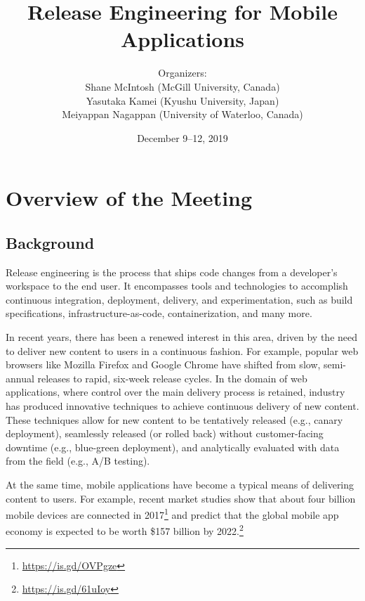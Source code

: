 \documentclass[a4paper]{article}
\begin{document}
\SHONANmakecover

\title{Release Engineering for Mobile Applications}
\author{Organizers:\\
Shane McIntosh (McGill University, Canada)\\
Yasutaka Kamei (Kyushu University, Japan)\\
Meiyappan Nagappan (University of Waterloo, Canada)}
\date{December 9--12, 2019}
\maketitle

\section{Overview of the Meeting}

\subsection{Background}

Release engineering is the process that ships code changes from a developer's workspace to the end user.
It encompasses tools and technologies to accomplish continuous integration, deployment, delivery, and experimentation, such as build specifications, infrastructure-as-code, containerization, and many more.

In recent years, there has been a renewed interest in this area, driven by the need to deliver new content to users in a continuous fashion.
For example, popular web browsers like Mozilla Firefox and Google Chrome have shifted from slow, semi-annual releases to rapid, six-week release cycles.
In the domain of web applications, where control over the main delivery process is retained, industry has produced innovative techniques to achieve continuous delivery of new content.
These techniques allow for new content to be tentatively released (e.g., canary deployment), seamlessly released (or rolled back) without customer-facing downtime (e.g., blue-green deployment), and analytically evaluated with data from the field (e.g., A/B testing).

At the same time, mobile applications have become a typical means of delivering content to users. For example, recent market studies show that about four billion mobile devices are connected in 2017\footnote{\url{https://is.gd/OVPgze}} and predict that the global mobile app economy is expected to be worth \$157 billion by 2022.\footnote{\url{https://is.gd/61uIoy}}
\end{document}
